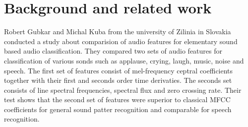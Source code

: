 \section{Background and related work}
Robert Gubkar and Michal Kuba from the university of Zilinia in Slovakia
conducted a study about comparision of audio features for elementary sound
based audio classification. They compared two sets of audio features for classification
of various sonds such as applause, crying, laugh, music, noise and speech.
The first set of features consist of mel-frequency ceptral coefficients together with
their first and seconds order time derivaties. The seconds set consists of line
spectral frequencies, spectral flux and zero crossing rate. Their test shows that
the second set of features were superior to classical MFCC coefficients for general
sound patter recognition and comparable for speech recognition.
